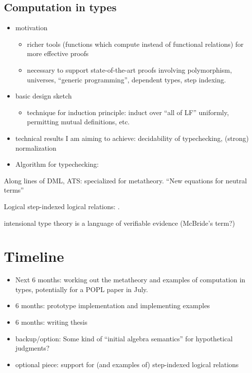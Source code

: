 \documentclass{article}
\begin{document}
\subsection{Computation in types}
\begin{itemize}
\item motivation
\begin{itemize}
\item richer tools (functions which compute instead of functional
relations) for more effective proofs
\item necessary to support state-of-the-art proofs involving polymorphism,
universes, ``generic programming'', dependent types, step indexing.
\end{itemize}
\item basic design sketch
\begin{itemize}
\item technique for induction principle: induct over ``all of LF'' uniformly, permitting mutual definitions, etc.
\end{itemize}
\item technical results I am aiming to achieve: decidability
  of typechecking, (strong) normalization
\item Algorithm for typechecking: \citep{Coquand91,Harper05,Abel11}
\end{itemize}

Along lines of DML, ATS: specialized for metatheory. ``New equations for neutral terms'' \cite{Allais13}

Logical step-indexed logical relations: \cite{Dreyer11}.

intensional type theory is a language of verifiable evidence (McBride's term?)
\section{Timeline}
\begin{itemize}
\item Next 6 months: working out the metatheory and examples of computation in
types, potentially for a POPL paper in July.
\item 6 months: prototype implementation and implementing examples
\item 6 months: writing thesis
\item backup/option: Some kind of ``initial algebra semantics'' for hypothetical judgments?
\item optional piece: support for (and examples of) step-indexed
  logical relations
\end{itemize}



\end{document}
